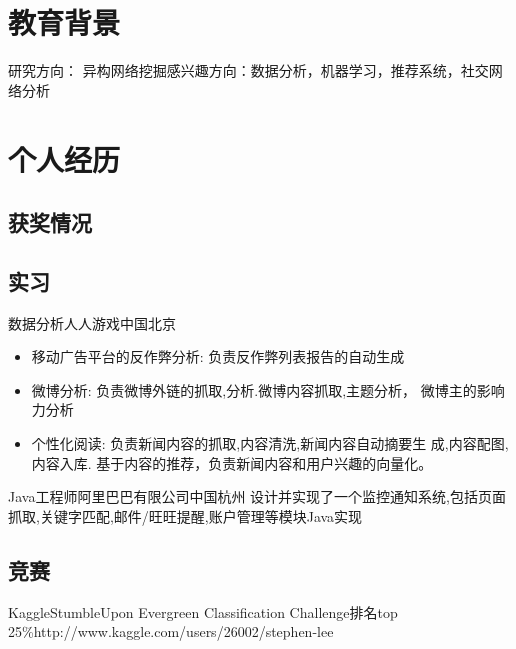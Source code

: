 \documentclass[11pt,a4paper]{moderncv}
\newcommand\myitem{\item[\textbullet]\hspace*{.5em} }
\begin{document}
\begin{CJK}{UTF8}{gkai}
\maketitle

\section{教育背景}
{研究方向： 异构网络挖掘}{感兴趣方向：数据分析，机器学习，推荐系统，社交网络分析}

 {}{} %

\section{个人经历}

\subsection{获奖情况}

\subsection{实习}
{数据分析}{人人游戏}{中国北京}{}{}{%
  \begin{itemize}\setlength\itemindent{2pt}
    \myitem 移动广告平台的反作弊分析: 负责反作弊列表报告的自动生成
    \myitem 微博分析: 负责微博外链的抓取,分析.微博内容抓取,主题分析，
    微博主的影响力分析
    \myitem 个性化阅读: 负责新闻内容的抓取,内容清洗,新闻内容自动摘要生
    成,内容配图,内容入库.
    基于内容的推荐，负责新闻内容和用户兴趣的向量化。
  \end{itemize}
}
\vspace{8 mm}
{Java工程师}{阿里巴巴有限公司}{中国杭州}
{设计并实现了一个监控通知系统,包括页面抓取,关键字匹配,邮件/旺旺提醒,账户管理等模块}{Java实现}{}

\subsection{竞赛}
{Kaggle}{StumbleUpon Evergreen Classification Challenge}{排名}{top 25\%}{http://www.kaggle.com/users/26002/stephen-lee}{}

\end{CJK}
\end{document}
